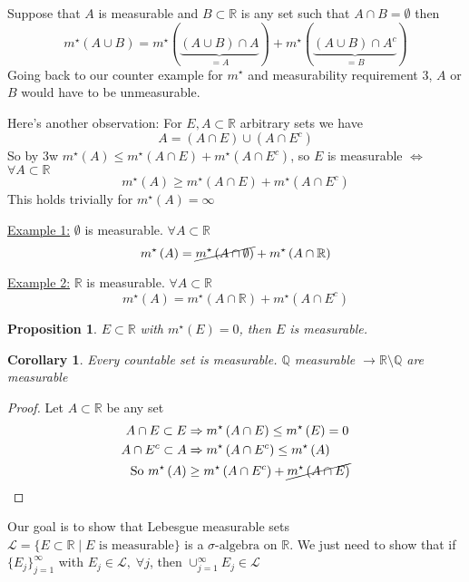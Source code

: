 \documentclass[11pt]{article}
\newtheorem*{prop}{Proposition}
\newtheorem*{*corollary}{Corollary}
\newcommand{\siga}{\sigma\text{-algebra}}
\newcommand{\mstar}[1]{m^{\star}\left(#1\right)}
\begin{document}
    Suppose that $A$ is measurable and $B \subset \mathbb{R}$ is any set such that $A \cap B = \emptyset$ then
    \[
        \mstar{A \cup B} = \mstar{\underbrace{(A \cup B) \cap A}_{=A}} + \mstar{\underbrace{(A \cup B) \cap A^{c}}_{=B}}
    \]
    Going back to our counter example for $m^{\star}$ and measurability requirement 3, $A$ or $B$ would have to be unmeasurable.

    Here's another observation: For $E, A \subset \mathbb{R}$ arbitrary sets we have
    \[
        A = (A \cap E) \cup (A \cap E^{c})
    \]
    So by 3w $\mstar{A} \leq \mstar{A \cap E} + \mstar{A \cap E^{c}}$, so $E$ is measurable $\iff$ $\forall A \subset \mathbb{R}$
    \[
        \boxed{\mstar{A} \geq \mstar{A \cap E} + \mstar{A \cap E^{c}}}
    \]
    This holds trivially for $\mstar{A} = \infty$

    \underline{Example 1:} $\emptyset$ is measurable.
    $\forall A \subset \mathbb{R}$
    \[
        \mstar{A} = \cancel{\mstar{A \cap \emptyset}} + \mstar{A \cap \mathbb{R}}
    \]

    \underline{Example 2:} $\mathbb{R}$ is measurable.
    $\forall A \subset \mathbb{R}$
    \[
        \mstar{A} = \mstar{A \cap \mathbb{R}} + \mstar{A \cap E^{c}}
    \]

    \begin{prop}
        $E \subset \mathbb{R}$ with $\mstar{E} = 0$, then $E$ is measurable.
    \end{prop}

    \begin{*corollary}
        Every countable set is measurable.
        $\mathbb{Q}$ measurable $\rightarrow \mathbb{R} \setminus \mathbb{Q}$ are measurable
    \end{*corollary}

    \begin{proof}
        Let $A \subset \mathbb{R}$ be any set
        \begin{align*}
            A \cap E \subset E &\Rightarrow \mstar{A \cap E} \leq \mstar{E} = 0 \\
            A \cap E^{c} \subset A &\Rightarrow \mstar{A \cap E^{c}} \leq \mstar{A} \\
            \text{ So } \mstar{A} &\geq \mstar{A \cap E^c} + \cancel{\mstar{A \cap E}}
        \end{align*}
    \end{proof}

    Our goal is to show that Lebesgue measurable sets $\mathcal{L} = \{ E \subset \mathbb{R} \mid E \text{ is measurable} \}$ is a $\siga$ on $\mathbb{R}$.
    We just need to show that if $\{ E_j \}_{j=1}^{\infty}$ with $E_j \in \mathcal{L}, \; \forall j$, then $\cup_{j=1}^{\infty} E_j \in \mathcal{L}$
\end{document}
